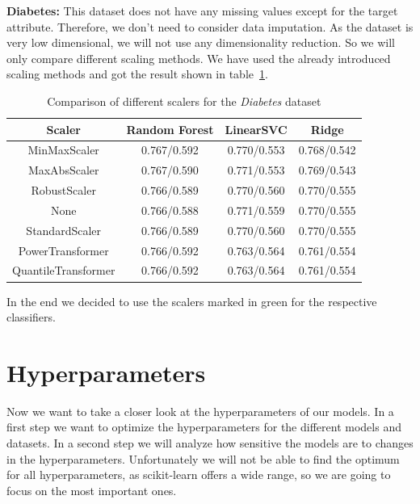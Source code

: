 \documentclass[a4paper,10pt]{article}
\begin{document}
\textbf{Diabetes:} This dataset does not have any missing values except for the target attribute. Therefore, we 
 don't need to consider data imputation. As the dataset is very low dimensional, we will not use any dimensionality reduction. 
 So we will only compare different scaling methods. We have used the already introduced scaling methods 
 and got the result shown in table~\ref{table:diabetesscalers}.
 \begin{table}[h!]
\centering
\begin{tabular}{|c|c|c|c|}
\hline
\textbf{Scaler} & \textbf{Random Forest } & \textbf{LinearSVC } & \textbf{Ridge } \\
\hline
MinMaxScaler & \cellcolor[HTML]{C1E1C1}0.767/0.592 & 0.770/0.553 & 0.768/0.542 \\
\hline
MaxAbsScaler & 0.767/0.590 & 0.771/0.553 & 0.769/0.543 \\
\hline
RobustScaler & 0.766/0.589 & 0.770/0.560 & 0.770/0.555 \\
\hline
None & 0.766/0.588 & \cellcolor[HTML]{C1E1C1}0.771/0.559 & 0.770/0.555 \\
\hline
StandardScaler & 0.766/0.589 & 0.770/0.560 & \cellcolor[HTML]{C1E1C1}0.770/0.555 \\
\hline
PowerTransformer & 0.766/0.592 & 0.763/0.564 & 0.761/0.554 \\
\hline
QuantileTransformer & 0.766/0.592 & 0.763/0.564 & 0.761/0.554 \\
\hline
\end{tabular}
\caption{Comparison of different scalers for the \textit{Diabetes} dataset}
\label{table:diabetesscalers}
\end{table}
In the end we decided to use the scalers marked in green for the respective classifiers.\\







\section{Hyperparameters}
\label{sec:hyperparameters}
Now we want to take a closer look at the hyperparameters of our models. In a first step we want to optimize the hyperparameters for the different models and datasets.
In a second step we will analyze how sensitive the models are to changes in the hyperparameters. Unfortunately we will not be able to find the optimum for all hyperparameters, as scikit-learn offers a wide range, so we are going to focus on the most important ones.
\end{document}
